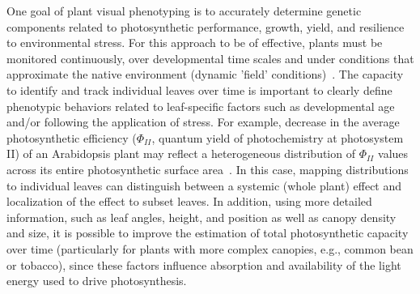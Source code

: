 One goal of plant visual phenotyping is to accurately determine genetic components related to photosynthetic performance, growth, yield, and resilience to environmental stress.
For this approach to be of effective, plants must be monitored continuously, over developmental time scales and under conditions that approximate the native environment (dynamic 'field' conditions)~\cite{fahlgren2015lights,walter2015plant}.
The capacity to identify and track individual leaves over time is important to clearly define phenotypic behaviors related to leaf-specific factors such as developmental age~\cite{schottler2015photosynthetic} and/or following the application of stress.
For example, decrease in the average photosynthetic efficiency ($\Phi_{II}$, quantum yield of photochemistry at photosystem II) of an Arabidopsis plant may reflect a heterogeneous distribution of $\Phi_{II}$ values across its entire photosynthetic surface area~\cite{oxborough2004imaging}.
In this case, mapping distributions to individual leaves can distinguish between a systemic (whole plant) effect and localization of the effect to subset leaves.
In addition, using more detailed information, such as leaf angles, height, and position as well as canopy density and size, it is possible to improve the estimation of total photosynthetic capacity over time (particularly for plants with more complex canopies, e.g., common bean or tobacco), since these factors influence absorption and availability of the light energy used to drive photosynthesis.


